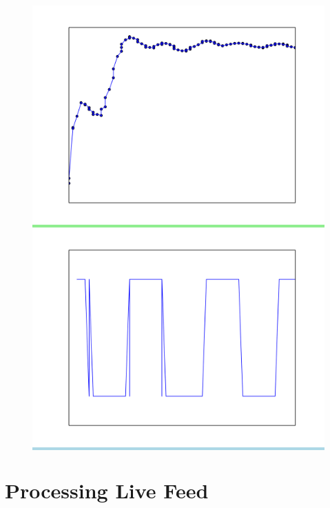 \documentclass[aspectratio=169]{beamer}
\begin{document}
\begin{frame}[foot]
\begin{figure}
{{{       \colorbox{lightgreen}{ \includegraphics[height=.41\textheight]{./gfx/feature2.png} }
       }
       \vspace*{-1em}
       \colorbox{lightblue}{ \includegraphics[height=.41\textheight]{./gfx/feature3.png} }
     }}

    \end{figure}
  \end{frame}

\section{Processing Live Feed}
\end{document}
